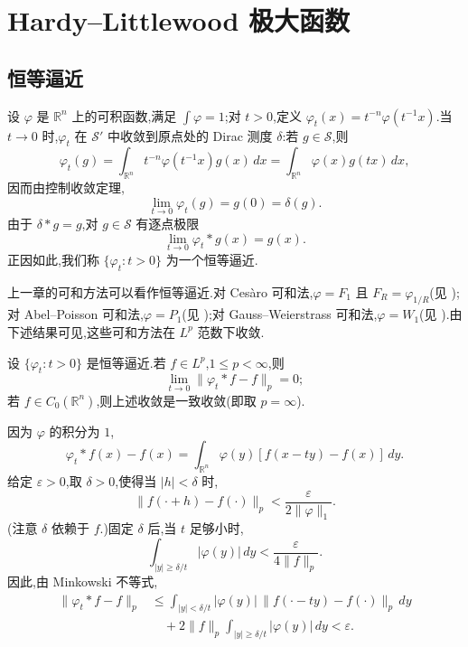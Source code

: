 \setcounter{section}{1}
\section{Hardy--Littlewood 极大函数}
\label{chap:hardy-littlewood-maximal-function}

\hypertarget{sample-page-037}{}
\subsection{恒等逼近}
\label{sec:ch2-identity-approximations}

设 $\varphi$ 是 $\mathbb{R}^n$ 上的可积函数,满足 $\int\varphi=1$;对 $t>0$,定义
$\varphi_t(x)=t^{-n}\varphi(t^{-1}x)$.当 $t\to0$ 时,$\varphi_t$ 在 $\mathcal S'$ 中收敛到原点处的 Dirac 测度 $\delta$:若 $g\in\mathcal S$,则
\[
 \varphi_t(g)=\int_{\mathbb R^n}t^{-n}\varphi(t^{-1}x)g(x)\,dx
 =\int_{\mathbb R^n}\varphi(x)g(tx)\,dx,
\]
因而由控制收敛定理,
\[
 \lim_{t\to0}\varphi_t(g)=g(0)=\delta(g).
\]
由于 $\delta*g=g$,对 $g\in\mathcal S$ 有逐点极限
\[
 \lim_{t\to0}\varphi_t*g(x)=g(x).
\]
正因如此,我们称 $\{\varphi_t:t>0\}$ 为一个恒等逼近.

上一章的可和方法可以看作恒等逼近.对 Cesàro 可和法,$\varphi=F_1$ 且 $F_R=\varphi_{1/R}$(见 );对 Abel--Poisson 可和法,$\varphi=P_1$(见 );对 Gauss--Weierstrass 可和法,$\varphi=W_1$(见 ).由下述结果可见,这些可和方法在 $L^p$ 范数下收敛.

\begin{Theorem}
\label{thm:ch2-approximation-identity-lp}
设 $\{\varphi_t:t>0\}$ 是恒等逼近.若 $f\in L^p$,$1\le p<\infty$,则
\[
 \lim_{t\to0}\|\varphi_t*f-f\|_p=0;
\]
若 $f\in C_0(\mathbb R^n)$,则上述收敛是一致收敛(即取 $p=\infty$).
\end{Theorem}

\hypertarget{sample-page-038}{}
\begin{Proof}
因为 $\varphi$ 的积分为 $1$,
\[
 \varphi_t*f(x)-f(x)=\int_{\mathbb R^n}\varphi(y)[f(x-ty)-f(x)]\,dy.
\]
给定 $\varepsilon>0$,取 $\delta>0$,使得当 $|h|<\delta$ 时,
\[
 \|f(\cdot+h)-f(\cdot)\|_p<\frac{\varepsilon}{2\|\varphi\|_1}.
\]
(注意 $\delta$ 依赖于 $f$.)固定 $\delta$ 后,当 $t$ 足够小时,
\[
 \int_{|y|\ge\delta/t}|\varphi(y)|\,dy<\frac{\varepsilon}{4\|f\|_p}.
\]
因此,由 Minkowski 不等式,
\[
\begin{aligned}
 \|\varphi_t*f-f\|_p
 &\le \int_{|y|<\delta/t}|\varphi(y)|\,
       \|f(\cdot-ty)-f(\cdot)\|_p\,dy\\
 &\quad+2\|f\|_p\int_{|y|\ge\delta/t}|\varphi(y)|\,dy
 <\varepsilon.
\end{aligned}
\]
\end{Proof}

